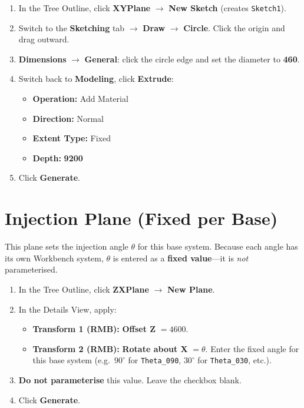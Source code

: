 \documentclass[12pt,a4paper]{report}
\begin{document}
\begin{enumerate}
  \item In the Tree Outline, click \textbf{XYPlane} $\rightarrow$
        \textbf{New Sketch} (creates \texttt{Sketch1}).
  \item Switch to the \textbf{Sketching} tab $\rightarrow$ \textbf{Draw}
        $\rightarrow$ \textbf{Circle}.  Click the origin and drag outward.
  \item \textbf{Dimensions} $\rightarrow$ \textbf{General}: click the circle
        edge and set the diameter to \textbf{460}.
  \item Switch back to \textbf{Modeling}, click \textbf{Extrude}:
  \begin{itemize}
    \item \textbf{Operation:} Add Material
    \item \textbf{Direction:} Normal
    \item \textbf{Extent Type:} Fixed
    \item \textbf{Depth:} \textbf{9200}
  \end{itemize}
  \item Click \textbf{Generate}.
\end{enumerate}

\noindent{}


\section{Injection Plane (Fixed per Base)}
\label{sec:injplane}

This plane sets the injection angle $\theta$ for this base system.
Because each angle has its own Workbench system, $\theta$ is entered as
a \textbf{fixed value}---it is \emph{not} parameterised.

\begin{enumerate}
  \item In the Tree Outline, click \textbf{ZXPlane} $\rightarrow$
        \textbf{New Plane}.
  \item In the Details View, apply:
  \begin{itemize}
    \item \textbf{Transform 1 (RMB):} \textbf{Offset Z} $= 4600$.
    \item \textbf{Transform 2 (RMB):} \textbf{Rotate about X} $= \theta$.
          Enter the fixed angle for this base system (e.g.\ $90^\circ$
          for \texttt{Theta\_090}, $30^\circ$ for \texttt{Theta\_030},
          etc.).
  \end{itemize}
  \item \textbf{Do not parameterise} this value.  Leave the checkbox
        blank.
  \item Click \textbf{Generate}.
\end{enumerate}
\end{document}
